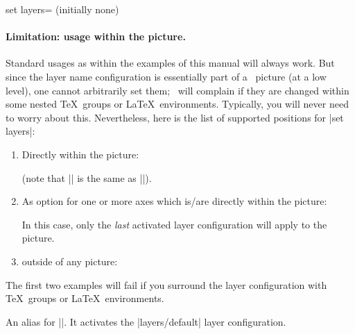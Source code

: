 {\begin{pgfplotskey}{set layers= (initially none)}
    \paragraph{Limitation: usage within the picture.} Standard usages as within the examples of this manual will always work. But since the layer name configuration is essentially part of a \PGF\ picture (at a low level), one cannot arbitrarily set them; \PGF\ will complain if they are changed within some nested \TeX\ groups or \LaTeX\ environments. Typically, you will never need to worry about this. Nevertheless, here is the list of supported positions for |set layers|:
    \begin{enumerate}
        \item Directly within the picture:
\begin{codeexample}
\end{codeexample}
	(note that || is the same as |\pgfplotsset{set layers}|).
	 \item As option for one or more axes which is/are directly within the picture:
\begin{codeexample}
\end{codeexample}
		In this case, only the \emph{last} activated layer configuration will apply to the picture.
	\item outside of any picture:
\begin{codeexample}
{}
\end{codeexample}
    \end{enumerate}
	The first two examples will fail if you surround the layer configuration with \TeX\ groups or \LaTeX\ environments.
\end{pgfplotskey}

\begin{command}{}
    An alias for |\pgfplotsset{set layers}|. It activates the |layers/default| layer configuration.
     

\end{command}}
